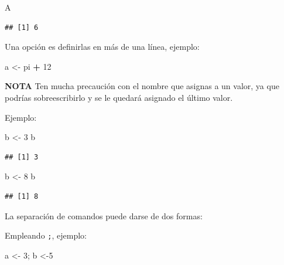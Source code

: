 \documentclass[
]{book}
\newenvironment{Shaded}{\begin{snugshade}}{\end{snugshade}}
\newcommand{\DecValTok}[1]{\textcolor[rgb]{0.00,0.00,0.81}{#1}}
\newcommand{\NormalTok}[1]{#1}
\newcommand{\OtherTok}[1]{\textcolor[rgb]{0.56,0.35,0.01}{#1}}
\newcommand{\SpecialCharTok}[1]{\textcolor[rgb]{0.81,0.36,0.00}{\textbf{#1}}}
\begin{document}
\begin{Shaded}
\begin{Highlighting}[]
\NormalTok{A}
\end{Highlighting}
\end{Shaded}

\begin{verbatim}
## [1] 6
\end{verbatim}

Una opción es definirlas en más de una línea, ejemplo:

\begin{Shaded}
\begin{Highlighting}[]
\NormalTok{a }\OtherTok{\textless{}{-}}
\NormalTok{  pi }\SpecialCharTok{+} \DecValTok{12}
\end{Highlighting}
\end{Shaded}

\textbf{NOTA} Ten mucha precaución con el nombre que asignas a un valor, ya que podrías sobreescribirlo y se le quedará asignado el último valor.

Ejemplo:

\begin{Shaded}
\begin{Highlighting}[]
\NormalTok{b }\OtherTok{\textless{}{-}} \DecValTok{3}
\NormalTok{b}
\end{Highlighting}
\end{Shaded}

\begin{verbatim}
## [1] 3
\end{verbatim}

\begin{Shaded}
\begin{Highlighting}[]
\NormalTok{b }\OtherTok{\textless{}{-}} \DecValTok{8} 
\NormalTok{b}
\end{Highlighting}
\end{Shaded}

\begin{verbatim}
## [1] 8
\end{verbatim}

La separación de comandos puede darse de dos formas:

Empleando \texttt{;}, ejemplo:

\begin{Shaded}
\begin{Highlighting}[]
\NormalTok{a }\OtherTok{\textless{}{-}} \DecValTok{3}\NormalTok{; b }\OtherTok{\textless{}{-}}\DecValTok{5}
\end{Highlighting}
\end{Shaded}
\end{document}
